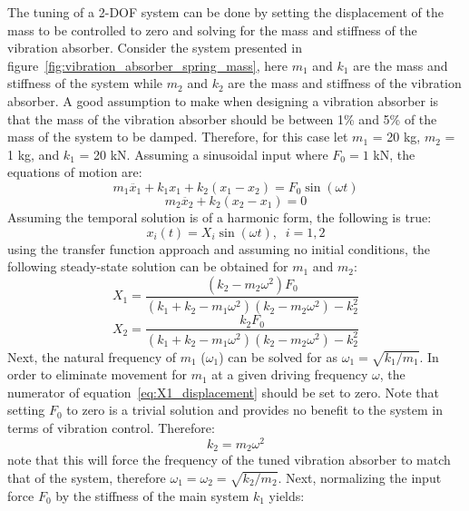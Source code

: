 \documentclass[12pt,letter]{article}
\begin{document}
The tuning of a 2-DOF system can be done by setting the displacement of the mass to be controlled to zero and solving for the mass and stiffness of the vibration absorber. Consider the system presented in figure~\ref{fig:vibration_absorber_spring_mass}, here $m_1$ and $k_1$ are the mass and stiffness of the system while $m_2$ and $k_2$ are the mass and stiffness of the vibration absorber. A good assumption to make when designing a vibration absorber is that the mass of the vibration absorber should be between 1\% and 5\% of the mass of the system to be damped. Therefore, for this case let $m_1$ = 20 kg, $m_2$ = 1 kg, and $k_1$ = 20 kN. Assuming a sinusoidal input where $F_0 = 1$ kN, the equations of motion are:
\begin{equation}
m_1\ddot{x_1} + k_1 x_1 + k_2(x_1-x_2)  = F_0 \sin (\omega t)
\end{equation}
\begin{equation}
m_2\ddot{x_2} + k_2(x_2-x_1) = 0
\end{equation}
Assuming the temporal solution is of a harmonic form, the following is true:
\begin{equation}
x_i(t) = X_i \sin (\omega t ), \; \; i=1,2
\end{equation}
using the transfer function approach and assuming no initial conditions, the following steady-state solution can be obtained for $m_1$ and $m_2$:
\begin{equation}
X_1 = \frac{(k_2 - m_2 \omega^2)F_0}{(k_1+k_2-m_1 \omega^2)(k_2-m_2 \omega^2) -k_2^2}
\label{eq:X1_displacement}
\end{equation}
\begin{equation}
X_2 = \frac{k_2 F_0}{(k_1+k_2-m_1 \omega^2)(k_2-m_2 \omega^2) -k_2^2}
\label{eq:X2_displacement}
\end{equation}
Next, the natural frequency of $m_1$ ($\omega_1$) can be solved for as $\omega_1=\sqrt{k_1 / m_1}$. In order to eliminate movement for $m_1$ at a given driving frequency $\omega$, the numerator of equation~\ref{eq:X1_displacement} should be set to zero. Note that setting $F_0$ to zero is a trivial solution and provides no benefit to the system in terms of vibration control. Therefore:
\begin{equation}
k_2 = m_2 \omega^2
\end{equation}
note that this will force the frequency of the tuned vibration absorber to match that of the system, therefore $\omega_1 = \omega_2 = \sqrt{k_2 / m_2}$. Next, normalizing the input force $F_0$ by the stiffness of the main system $k_1$ yields:
\end{document}

